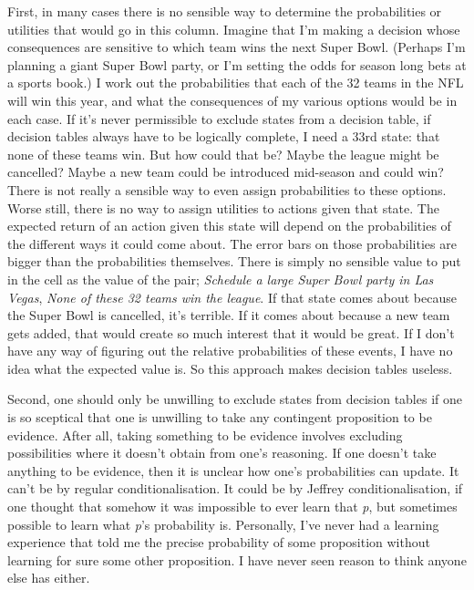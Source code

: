 \documentclass[
  10pt,
  letterpaper,
  twoside]{scrbook}
\begin{document}
First, in many cases there is no sensible way to determine the
probabilities or utilities that would go in this column. Imagine that
I'm making a decision whose consequences are sensitive to which team
wins the next Super Bowl. (Perhaps I'm planning a giant Super Bowl
party, or I'm setting the odds for season long bets at a sports book.) I
work out the probabilities that each of the 32 teams in the NFL will win
this year, and what the consequences of my various options would be in
each case. If it's never permissible to exclude states from a decision
table, if decision tables always have to be logically complete, I need a
33rd state: that none of these teams win. But how could that be? Maybe
the league might be cancelled? Maybe a new team could be introduced
mid-season and could win? There is not really a sensible way to even
assign probabilities to these options. Worse still, there is no way to
assign utilities to actions given that state. The expected return of an
action given this state will depend on the probabilities of the
different ways it could come about. The error bars on those
probabilities are bigger than the probabilities themselves. There is
simply no sensible value to put in the cell as the value of the pair;
\emph{Schedule a large Super Bowl party in Las Vegas}, \emph{None of
these 32 teams win the league}. If that state comes about because the
Super Bowl is cancelled, it's terrible. If it comes about because a new
team gets added, that would create so much interest that it would be
great. If I don't have any way of figuring out the relative
probabilities of these events, I have no idea what the expected value
is. So this approach makes decision tables useless.

Second, one should only be unwilling to exclude states from decision
tables if one is so sceptical that one is unwilling to take any
contingent proposition to be evidence. After all, taking something to be
evidence involves excluding possibilities where it doesn't obtain from
one's reasoning. If one doesn't take anything to be evidence, then it is
unclear how one's probabilities can update. It can't be by regular
conditionalisation. It could be by Jeffrey conditionalisation, if one
thought that somehow it was impossible to ever learn that \emph{p}, but
sometimes possible to learn what \emph{p}'s probability is. Personally,
I've never had a learning experience that told me the precise
probability of some proposition without learning for sure some other
proposition. I have never seen reason to think anyone else has either.
\end{document}
